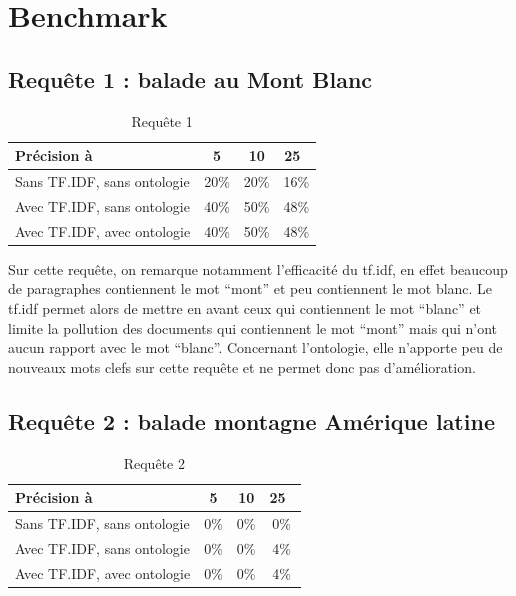 \documentclass{article}
\begin{document}
\section{Benchmark}

\subsection{Requête 1 : \og balade au Mont Blanc \fg }

\begin{table}[H]
    \centering
    \caption{Requête 1}
\begin{tabular}{|l|c|c|c|}
    \hline
    Précision à & 5 & 10 & 25 \\
    \hline
    Sans TF.IDF, sans ontologie & 20\% & 20\% &  16\% \\
    \hline
    Avec TF.IDF, sans ontologie & 40\% & 50\% &  48\% \\
    \hline
    Avec TF.IDF, avec ontologie & 40\% & 50\% &  48\% \\
    \hline
\end{tabular}
\end{table}

Sur cette requête, on remarque notamment l'efficacité du tf.idf, en effet beaucoup de
paragraphes contiennent le mot “mont” et peu contiennent le mot blanc. Le tf.idf
permet alors de mettre en avant ceux qui contiennent le mot “blanc” et limite la
pollution des documents qui contiennent le mot “mont”  mais qui n’ont aucun rapport
avec le mot “blanc”. Concernant l’ontologie, elle n’apporte peu de nouveaux mots clefs
sur cette requête et ne permet donc pas d’amélioration.


\subsection{Requête 2 : \og balade montagne Amérique latine \fg }

\begin{table}[H]
    \centering
    \caption{Requête 2}
\begin{tabular}{|l|c|c|c|}
    \hline
    Précision à & 5 & 10 & 25 \\
    \hline
    Sans TF.IDF, sans ontologie & 0\% & 0\% &  0\% \\
    \hline
    Avec TF.IDF, sans ontologie & 0\% & 0\% &  4\% \\
    \hline
    Avec TF.IDF, avec ontologie & 0\% & 0\% &  4\% \\
    \hline
\end{tabular}
\end{table}
\end{document}
